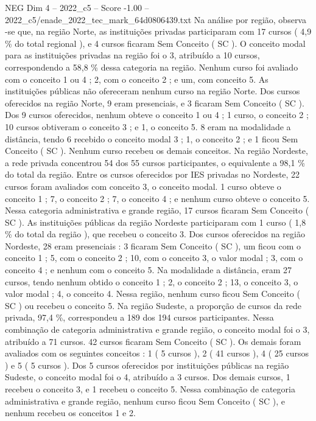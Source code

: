 \begin{textsample}{NEG Dim 4 – 2022\_c5 – Score -1.00 – 2022\_c5/enade\_2022\_tec\_mark\_64d0806439.txt}
Na análise por região, observa -se que, na região Norte, as instituições privadas participaram com 17 cursos ( 4,9 \% do total regional ), e 4 cursos ficaram Sem Conceito ( SC ).
O conceito modal para as instituições privadas na região foi o 3, atribuído a 10 cursos, correspondendo a 58,8 \% dessa categoria na região.
Nenhum curso foi avaliado com o conceito 1 ou 4 ; 2, com o conceito 2 ; e um, com conceito 5.
As instituições públicas não ofereceram nenhum curso na região Norte.
Dos cursos oferecidos na região Norte, 9 eram presenciais, e 3 ficaram Sem Conceito ( SC ).
Dos 9 cursos oferecidos, nenhum obteve o conceito 1 ou 4 ; 1 curso, o conceito 2 ; 10 cursos obtiveram o conceito 3 ; e 1, o conceito 5. 8 eram na modalidade a distância, tendo 6 recebido o conceito modal 3 ; 1, o conceito 2 ; e 1 ficou Sem Conceito ( SC ).
Nenhum curso recebeu os demais conceitos.
Na região Nordeste, a rede privada concentrou 54 dos 55 cursos participantes, o equivalente a 98,1 \% do total da região.
Entre os cursos oferecidos por IES privadas no Nordeste, 22 cursos foram avaliados com conceito 3, o conceito modal. 1 curso obteve o conceito 1 ; 7, o conceito 2 ; 7, o conceito 4 ; e nenhum curso obteve o conceito 5.
Nessa categoria administrativa e grande região, 17 cursos ficaram Sem Conceito ( SC ).
As instituições públicas da região Nordeste participaram com 1 curso ( 1,8 \% do total da região ), que recebeu o conceito 3.
Dos cursos oferecidos na região Nordeste, 28 eram presenciais : 3 ficaram Sem Conceito ( SC ), um ficou com o conceito 1 ; 5, com o conceito 2 ; 10, com o conceito 3, o valor modal ; 3, com o conceito 4 ; e nenhum com o conceito 5.
Na modalidade a distância, eram 27 cursos, tendo nenhum obtido o conceito 1 ; 2, o conceito 2 ; 13, o conceito 3, o valor modal ; 4, o conceito 4.
Nessa região, nenhum curso ficou Sem Conceito ( SC ) ou recebeu o conceito 5.
Na região Sudeste, a proporção de cursos da rede privada, 97,4 \%, correspondeu a 189 dos 194 cursos participantes.
Nessa combinação de categoria administrativa e grande região, o conceito modal foi o 3, atribuído a 71 cursos. 42 cursos ficaram Sem Conceito ( SC ).
Os demais foram avaliados com os seguintes conceitos : 1 ( 5 cursos ), 2 ( 41 cursos ), 4 ( 25 cursos ) e 5 ( 5 cursos ).
Dos 5 cursos oferecidos por instituições públicas na região Sudeste, o conceito modal foi o 4, atribuído a 3 cursos.
Dos demais cursos, 1 recebeu o conceito 3, e 1 recebeu o conceito 5.
Nessa combinação de categoria administrativa e grande região, nenhum curso ficou Sem Conceito ( SC ), e nenhum recebeu os conceitos 1 e 2.

\end{textsample}
